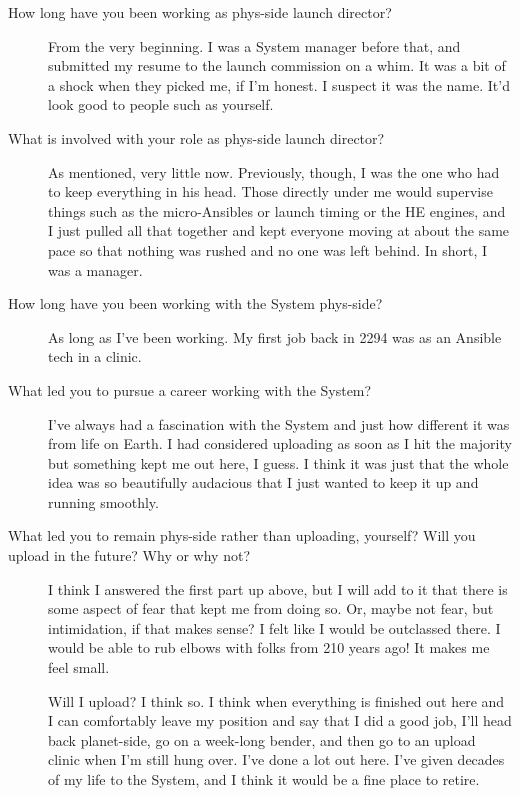 \begin{description}
\item[How long have you been working as phys-side launch director?]
From the very beginning. I was a System manager before that, and submitted my resume to the launch commission on a whim. It was a bit of a shock when they picked me, if I'm honest. I suspect it was the name. It'd look good to people such as yourself.
\item[What is involved with your role as phys-side launch director?]
As mentioned, very little now. Previously, though, I was the one who had to keep everything in his head. Those directly under me would supervise things such as the micro-Ansibles or launch timing or the HE engines, and I just pulled all that together and kept everyone moving at about the same pace so that nothing was rushed and no one was left behind. In short, I was a manager.
\item[How long have you been working with the System phys-side?]
As long as I've been working. My first job back in 2294 was as an Ansible tech in a clinic.
\item[What led you to pursue a career working with the System?]
I've always had a fascination with the System and just how different it was from life on Earth. I had considered uploading as soon as I hit the majority but something kept me out here, I guess. I think it was just that the whole idea was so beautifully audacious that I just wanted to keep it up and running smoothly.
\item[What led you to remain phys-side rather than uploading, yourself? Will you upload in the future? Why or why not?]
I think I answered the first part up above, but I will add to it that there is some aspect of fear that kept me from doing so. Or, maybe not fear, but intimidation, if that makes sense? I felt like I would be outclassed there. I would be able to rub elbows with folks from 210 years ago! It makes me feel small.

Will I upload? I think so. I think when everything is finished out here and I can comfortably leave my position and say that I did a good job, I'll head back planet-side, go on a week-long bender, and then go to an upload clinic when I'm still hung over. I've done a lot out here. I've given decades of my life to the System, and I think it would be a fine place to retire.


\end{description}
